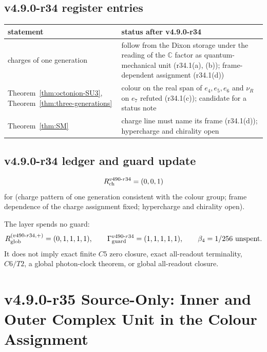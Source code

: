 \subsection*{v4.9.0-r34 register entries}
\label{subsec:v490-r34-register}

\begin{center}
\small
\begin{tabular}{@{}>{\raggedright\arraybackslash}p{}>{\raggedright\arraybackslash}p{}@{}}
\toprule
statement & status after v4.9.0-r34\\
\midrule
charges of one generation & follow from the Dixon storage under the reading of the \(\mathbb C\) factor as quantum-mechanical unit (r34.1(a), (b)); frame-dependent assignment (r34.1(d))\\
Theorem~\ref{thm:octonion-SU3}, Theorem~\ref{thm:three-generations} & colour on the real span of \(e_4,e_5,e_6\) and \(\nu_R\) on \(e_7\) refuted (r34.1(c)); candidate for a status note\\
Theorem~\ref{thm:SM} & charge line must name its frame (r34.1(d)); hypercharge and chirality open\\
\bottomrule
\end{tabular}
\end{center}

\subsection*{v4.9.0-r34 ledger and guard update}
\label{subsec:v490-r34-ledger-guard}

\[
R_{\rm ch}^{v490\text{-}r34}=(0,0,1)
\]
for (charge pattern of one generation consistent with the colour group; frame dependence of the charge assignment fixed;
hypercharge and chirality open).

The layer spends no guard:
\[
R_{\rm glob}^{(v490\text{-}r34,+)}=(0,1,1,1,1),
\qquad
\Gamma_{\rm guard}^{v490\text{-}r34}=(1,1,1,1,1),
\qquad
\beta_4=1/256\ \text{unspent}.
\]
It does not imply exact finite \(C5\) zero closure, exact all-readout terminality,
\(C6/T2\), a global photon-clock theorem, or global all-readout closure.
\clearpage
\section*{v4.9.0-r35 Source-Only: Inner and Outer Complex Unit in the Colour Assignment}
\label{sec:v490-r35-inner-outer-unit}

